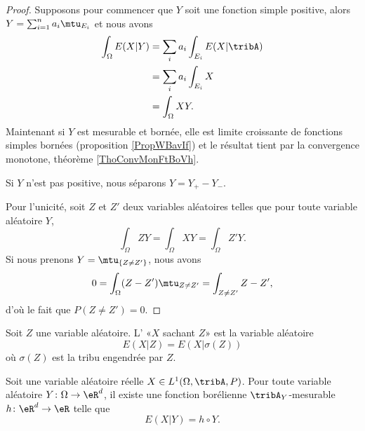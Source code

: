 \begin{proof}
    Supposons pour commencer que \( Y\) soit une fonction simple positive, alors \( Y=\sum_{i=1}^na_i\mtu_{E_i}\) et nous avons
    \begin{subequations}
        \begin{align}
            \int_{\Omega}E(X|Y)&=\sum_{i}a_i\int_{E_i}E(X|\tribA)\\
            &=\sum_ia_i\int_{E_i}X\\
            &=\int_{\Omega}XY.
        \end{align}
    \end{subequations}
    Maintenant si \( Y\) est mesurable et bornée, elle est limite croissante de fonctions simples bornées (proposition \ref{PropWBavIf}) et le résultat tient par la convergence monotone, théorème \ref{ThoConvMonFtBoVh}.

    Si \( Y\) n'est pas positive, nous séparons \( Y=Y_+-Y_-\).

    Pour l'unicité, soit \( Z\) et \( Z'\) deux variables aléatoires telles que pour toute variable aléatoire \( Y\),
    \begin{equation}
        \int_{\Omega}ZY=\int_{\Omega}XY=\int_{\Omega}Z'Y.
    \end{equation}
    Si nous prenons \( Y=\mtu_{\{ Z\neq Z' \}}\), nous avons
    \begin{equation}
        0=\int_{\Omega}(Z-Z')\mtu_{Z\neq Z'}=\int_{Z\neq Z'}Z-Z',
    \end{equation}
    d'où le fait que \( P(Z\neq Z')=0\).
\end{proof}

\begin{definition}
    Soit \( Z\) une variable aléatoire. L' «\( X\) sachant \( Z\)» est la variable aléatoire
    \begin{equation}
        E(X|Z)=E(X|\sigma(Z))
    \end{equation}
    où \( \sigma(Z)\) est la tribu engendrée par \( Z\).
\end{definition}

\begin{proposition}
    Soit une variable aléatoire réelle \( X\in L^1(\Omega,\tribA,P)\). Pour toute variable aléatoire \( Y\colon \Omega\to \eR^d\), il existe une fonction borélienne \( \tribA_Y\)-mesurable \( h\colon \eR^d\to \eR\) telle que
    \begin{equation}
        E(X|Y)=h\circ Y.
    \end{equation}
\end{proposition}

